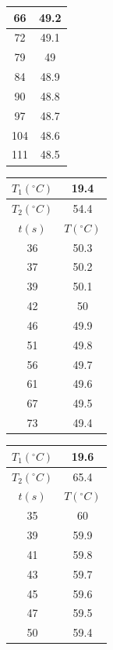 \documentclass[10pt,a4paper]{article}
\begin{document}
\begin{table}[h]
{\begin{subtable}[t]{0.2\textwidth}
\begin{tabular}{|c|c|}
\hline
66 & 49.2 \\ 
\hline
72 & 49.1 \\ 
\hline
79 & 49 \\ 
\hline
84 & 48.9 \\ 
\hline
90 & 48.8 \\ 
\hline
97 & 48.7 \\ 
\hline
104 & 48.6 \\ 
\hline
111 & 48.5 \\ 
\hline
\end{tabular}%
\end{subtable}
%
\begin{subtable}[t]{0.2\textwidth}
\centering
{}
\label{tab:r3}
\begin{tabular}{|c|c|}
\hline
$T_1 (^{\circ}C)$ & 19.4 \\
\hline
$T_2 (^{\circ}C)$ & 54.4 \\
\hline
\hline
\hline
$t (s)$ & $T (^{\circ}C)$ \\
\hline
36 & 50.3 \\ 
\hline
37 & 50.2 \\ 
\hline
39 & 50.1 \\ 
\hline
42 & 50 \\ 
\hline
46 & 49.9 \\ 
\hline
51 & 49.8 \\ 
\hline
56 & 49.7 \\ 
\hline
61 & 49.6 \\ 
\hline
67 & 49.5 \\ 
\hline
73 & 49.4 \\ 
\hline
\end{tabular}
\end{subtable}%
%
\begin{subtable}[t]{0.2\textwidth}
\centering
{}
\label{tab:r4}
\begin{tabular}{|c|c|}
\hline
$T_1 (^{\circ}C)$ & 19.6 \\
\hline
$T_2 (^{\circ}C)$ & 65.4 \\
\hline
\hline
\hline
$t (s)$ & $T (^{\circ}C)$ \\
\hline
35 & 60 \\ 
\hline
39 & 59.9 \\ 
\hline
41 & 59.8 \\ 
\hline
43 & 59.7 \\ 
\hline
45 & 59.6 \\ 
\hline
47 & 59.5 \\ 
\hline
50 & 59.4 \\ 

\end{tabular}
\end{subtable}}
\end{table}
\end{document}
